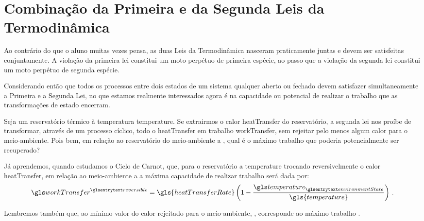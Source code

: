\chapter[%
    Combinação da Primeira e Segunda Leis%
]{%
    Combinação da Primeira e da Segunda Leis
    da Termodinâmica%
}   \label{chap:exergyAnalysis}

    Ao contrário do que o aluno muitas vezes pensa, as duas Leis da
    Termodinâmica nasceram praticamente juntas e devem ser satisfeitas
    conjuntamente. A violação da primeira lei constitui um moto perpétuo de
    primeira espécie, ao passo que a violação da segunda lei constitui um moto
    perpétuo de segunda espécie.

    Considerando então que todos os processos entre dois estados de um sistema
    qualquer aberto ou fechado devem satisfazer simultaneamente a Primeira e a
    Segunda Lei, no que estamos realmente interessados agora é na capacidade ou
    potencial de realizar o trabalho que as transformações de estado encerram.

    Seja um reservatório térmico à temperatura \gls{temperature}. Se extrairmos
    o calor \gls{heatTransfer} do reservatório, a segunda lei nos proíbe de
    transformar, através de um processo cíclico, todo o \gls{heatTransfer} em
    trabalho \gls{workTransfer}, sem rejeitar pelo menos algum calor
     para o meio-ambiente. Pois bem, em
    relação ao reservatório do meio-ambiente a
    , qual é o máximo trabalho que poderia
    potencialmente ser recuperado?

    Já aprendemos, quando estudamos o Ciclo de Carnot, que, para o reservatório
    a \gls{temperature} trocando reversivelmente o calor \gls{heatTransfer}, em
    relação ao meio-ambiente a  a máxima
    capacidade de realizar trabalho será dada por:
    \begin{equation} \label{eq:4.1}
        \gsuper{workTransfer}{reversible}
        =
        \gls{heatTransferRate}
        \left(
            1
            -
            \frac{
                \gsub{temperature}{environmentState}
            }{
                \gls{temperature}
            }
        \right)\,.
    \end{equation}

    Lembremos também que, ao mínimo valor do calor rejeitado para o
    meio-ambiente, ,
    corresponde ao máximo trabalho .

